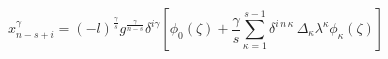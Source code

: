 \begin{equation}
x^{\gamma}_{n-s+i}=(-l)^{\frac{\gamma}{s}}g^{\frac{\gamma}{n-s}}
\delta^{i\gamma}\left[\phi_{0}(\zeta)+\frac{\gamma}{s}\sum_{\kappa=1}^{s-1}\delta^{i\,n\,\kappa}\,\Delta_{\kappa}\lambda^{\kappa}\phi_{\kappa}(\zeta)\right]
\label{s}
\end{equation}

